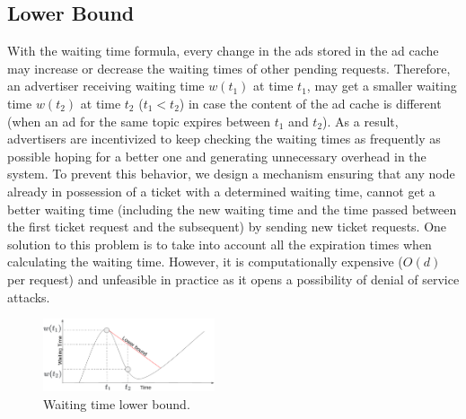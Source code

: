 \subsection{Lower Bound}
With the waiting time formula, every change in the ads stored in the ad cache may increase or decrease the waiting times of other pending requests. 
Therefore, an advertiser receiving waiting time $w(t_1)$ at time $t_1$, may get a smaller waiting time $w(t_2)$ at time $t_2$ ($t_1 < t_2$) in case the content of the ad cache is different (\eg when an ad for the same topic expires between $t_1$ and $t_2$). 
As a result, advertisers are incentivized to keep checking the waiting times as frequently as possible hoping for a better one and generating unnecessary overhead in the system.
To prevent this behavior, we design a mechanism ensuring that any node already in possession of a ticket with a determined waiting time, cannot get a better waiting time (including the new waiting time and the time passed between the first ticket request and the subsequent) by sending new ticket requests.
One solution to this problem is to take into account all the expiration times when calculating the waiting time. 
However, it is computationally expensive (\eg $O(d)$ per request) and unfeasible in practice as it opens a possibility of denial of service attacks. 

\begin{figure}
    \includegraphics[width=0.45\textwidth]{img/lower_bound.png}
    \vspace{-0.05in}
    \caption{Waiting time lower bound.}
    \label{fig:lower_bound}
    \vspace{-0.15in}
\end{figure}

